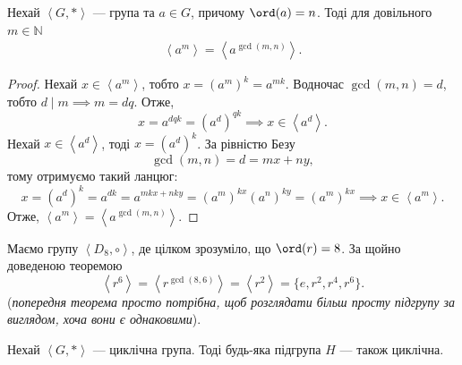 \documentclass{math_library}
\begin{document}
\begin{theorem}
Нехай $\left<G, *\right>$ --- група та $a \in G$, причому $\ord (a) = n$. Тоді для довільного $m \in \mathbb{N}$
\begin{align*}
\left<a^m\right> = \left<a^{\gcd(m,n)}\right>.
\end{align*}
\end{theorem}

\begin{proof}
Нехай $x \in \left<a^m\right>$, тобто $x = (a^m)^k = a^{mk}$. Водночас $\gcd(m,n) = d$, тобто $d \mid m \implies m = dq$. Отже,\[
x = a^{dqk} = (a^d)^{qk} \implies x \in \left<a^{d}\right>.
\]
Нехай $x \in \left<a^d\right>$, тоді $x = (a^d)^k$. За рівністю Безу \[ 
\gcd(m,n) = d = mx + ny,
\] тому отримуємо такий ланцюг:
\[
x= (a^d)^k = a^{dk} = a^{mkx + nky} = (a^{m})^{kx} (a^{n})^{ky} = (a^m)^{kx} \implies x \in \left<a^m\right>. 
\]
Отже, $\left<a^m\right> = \left<a^{\gcd(m,n)}\right>$.
\end{proof}

\begin{example}
Маємо групу $\left< D_{8}, \circ \right>$, де цілком зрозуміло, що $\ord (r) = 8$. За щойно доведеною теоремою 
\[
\left<r^6\right> = \left<r^{\gcd(8,6)}\right> = \left<r^2\right> = \{e,r^2,r^4,r^6\}.
\]
(\textit{попередня теорема просто потрібна, щоб розглядати більш просту підгрупу за виглядом, хоча вони є однаковими}).
\end{example}

\begin{theorem}
Нехай $\left< G, *\right>$ --- циклічна група. Тоді будь-яка підгрупа $H$ --- також циклічна.
\end{theorem}
\end{document}
